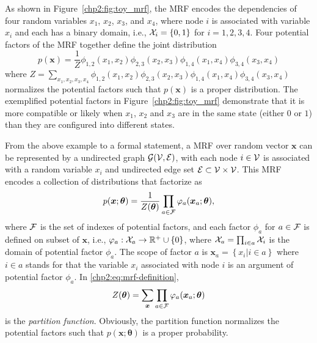 \begin{example}\label{chpt2:mrf-3node-example}
  As shown in Figure~\ref{chp2:fig:toy_mrf}, the MRF encodes the dependencies of four random variables $x_1$, $x_2$, $x_3$, and $x_4$, where node $i$ is associated with variable $x_i$ and each has a binary domain, i.e., $\mathcal{X}_i = \{0,1\}$ for $i =1, 2, 3, 4$. Four potential factors of the MRF together define the joint distribution
  \begin{equation*}
    p(\bm{x}) = \frac{1}{Z} \phi_{1,2}(x_1, x_2) \phi_{2,3}(x_2, x_3) \phi_{1,4}(x_1, x_4)\phi_{3,4}(x_3, x_4)
  \end{equation*}
  where $Z = \sum_{x_1, x_2, x_3, x_4}\phi_{1,2}(x_1, x_2) \phi_{2,3}(x_2, x_3) \phi_{1,4}(x_1, x_4)\phi_{3,4}(x_3, x_4)$ normalizes the potential factors such that $p(\bm{x})$ is a proper distribution. The exemplified potential factors in Figure~\ref{chp2:fig:toy_mrf} demonstrate that it is more compatible or likely when $x_1$, $x_2$ and $x_3$ are in the same state (either $0$ or $1$) than they are configured into different states.
\end{example}

From the above example to a formal statement, a MRF over random vector $\bm{x}$ can be represented by a undirected graph $\mathcal{G}(\mathcal{V}, \mathcal{E})$, with each node $i \in \mathcal{V}$ is associated with a random variable $x_i$ and undirected edge set $\mathcal{E} \subset \mathcal{V} \times \mathcal{V}$. This MRF encodes a collection of distributions that factorize as
\begin{equation}\label{chp2:eq:mrf-definition}
  p(\bm{x};\bm{\theta}) = \frac{1}{Z(\bm{\theta})} \prod_{a \in \mathcal{F}} \varphi_{a}(\bm{x}_{a};\bm{\theta}),
\end{equation}
where $\mathcal{F}$ is the set of indexes of potential factors, and each factor $\phi_{a}$ for $a\in \mathcal{F}$ is defined on subset of $\bm{x}$, i.e., $\varphi_{a}: \mathcal{X}_{a} \rightarrow \mathbb{R}^{+} \cup \{0\}$, where $\mathcal{X}_{a} = \prod_{i\in a}\mathcal{X}_i$ is the domain of potential factor $\phi_{a}$. The scope of factor $a$ is $\bm{x}_{a} = \left\{ x_i| i\in a \right\}$ where $i \in a$ stands for that the variable $x_i$ associated with node $i$ is an argument of potential factor $\phi_{a}$. In \eqref{chp2:eq:mrf-definition},
\begin{equation}
  Z(\bm{\theta}) = \sum_{\bm{x}} \prod_{a \in \mathcal{F}} \varphi_{a}(\bm{x}_{a};\bm{\theta})
\end{equation}
is the \textit{partition function}. Obviously, the partition function normalizes the potential factors such that $p(\bm{x}; \bm{\theta})$ is a proper probability.

